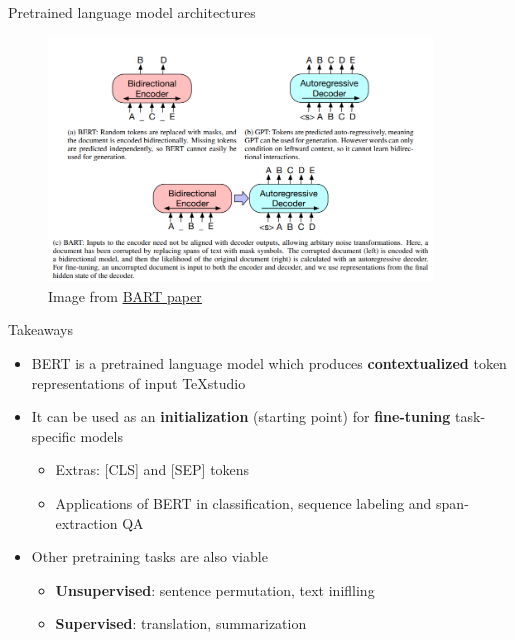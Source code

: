 \documentclass[12pt,aspectratio=169,handout]{beamer}
\begin{document}
\begin{frame}{Pretrained language model architectures}
	\begin{figure}[h]
		\includegraphics[height=6.5cm]{pretrained-lm-variants}
		\caption*{Image from \href{https://arxiv.org/pdf/1910.13461.pdf}{\underline{BART paper}}}
	\end{figure}
	
\end{frame}


\begin{frame}{Takeaways}
	
\begin{itemize}
	\item BERT is a pretrained language model which produces \textbf{contextualized} token representations of input TeXstudio
	\item It can be used as an \textbf{initialization} (starting point) for \textbf{fine-tuning} task-specific models
	\begin{itemize}
		\item Extras: [CLS] and [SEP] tokens
		\item Applications of BERT in classification, sequence labeling and span-extraction QA
	\end{itemize} 
	\item Other pretraining tasks are also viable
	\begin{itemize}
		\item \textbf{Unsupervised}: sentence permutation, text iniflling
		\item \textbf{Supervised}: translation, summarization
	\end{itemize}
\end{itemize}
	
\end{frame}
\end{document}
